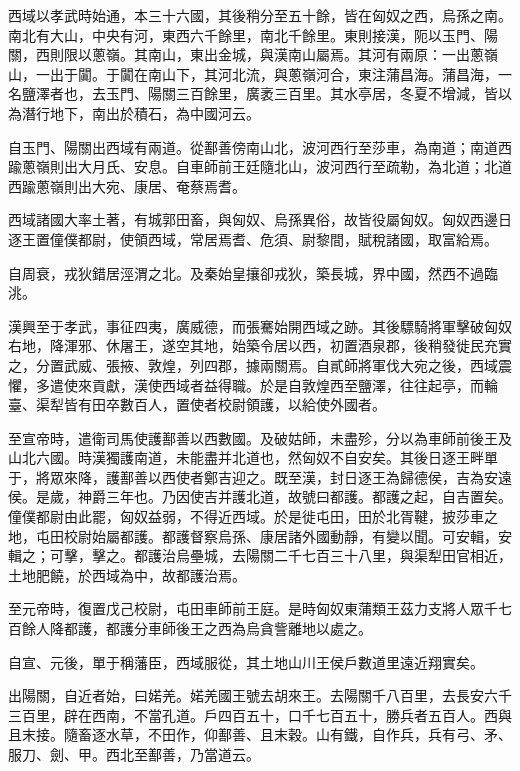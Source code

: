 
\begin{pinyinscope}
西域以孝武時始通，本三十六國，其後稍分至五十餘，皆在匈奴之西，烏孫之南。南北有大山，中央有河，東西六千餘里，南北千餘里。東則接漢，阨以玉門、陽關，西則限以蔥嶺。其南山，東出金城，與漢南山屬焉。其河有兩原：一出蔥嶺山，一出于闐。于闐在南山下，其河北流，與蔥嶺河合，東注蒲昌海。蒲昌海，一名鹽澤者也，去玉門、陽關三百餘里，廣袤三百里。其水亭居，冬夏不增減，皆以為潛行地下，南出於積石，為中國河云。

自玉門、陽關出西域有兩道。從鄯善傍南山北，波河西行至莎車，為南道；南道西踰蔥嶺則出大月氏、安息。自車師前王廷隨北山，波河西行至疏勒，為北道；北道西踰蔥嶺則出大宛、康居、奄蔡焉耆。

西域諸國大率土著，有城郭田畜，與匈奴、烏孫異俗，故皆役屬匈奴。匈奴西邊日逐王置僮僕都尉，使領西域，常居焉耆、危須、尉黎間，賦稅諸國，取富給焉。

自周衰，戎狄錯居涇渭之北。及秦始皇攘卻戎狄，築長城，界中國，然西不過臨洮。

漢興至于孝武，事征四夷，廣威德，而張騫始開西域之跡。其後驃騎將軍擊破匈奴右地，降渾邪、休屠王，遂空其地，始築令居以西，初置酒泉郡，後稍發徙民充實之，分置武威、張掖、敦煌，列四郡，據兩關焉。自貳師將軍伐大宛之後，西域震懼，多遣使來貢獻，漢使西域者益得職。於是自敦煌西至鹽澤，往往起亭，而輪臺、渠犁皆有田卒數百人，置使者校尉領護，以給使外國者。

至宣帝時，遣衛司馬使護鄯善以西數國。及破姑師，未盡殄，分以為車師前後王及山北六國。時漢獨護南道，未能盡并北道也，然匈奴不自安矣。其後日逐王畔單于，將眾來降，護鄯善以西使者鄭吉迎之。既至漢，封日逐王為歸德侯，吉為安遠侯。是歲，神爵三年也。乃因使吉并護北道，故號曰都護。都護之起，自吉置矣。僮僕都尉由此罷，匈奴益弱，不得近西域。於是徙屯田，田於北胥鞬，披莎車之地，屯田校尉始屬都護。都護督察烏孫、康居諸外國動靜，有變以聞。可安輯，安輯之；可擊，擊之。都護治烏壘城，去陽關二千七百三十八里，與渠犁田官相近，土地肥饒，於西域為中，故都護治焉。

至元帝時，復置戊己校尉，屯田車師前王庭。是時匈奴東蒲類王茲力支將人眾千七百餘人降都護，都護分車師後王之西為烏貪訾離地以處之。

自宣、元後，單于稱藩臣，西域服從，其土地山川王侯戶數道里遠近翔實矣。

出陽關，自近者始，曰婼羌。婼羌國王號去胡來王。去陽關千八百里，去長安六千三百里，辟在西南，不當孔道。戶四百五十，口千七百五十，勝兵者五百人。西與且末接。隨畜逐水草，不田作，仰鄯善、且末穀。山有鐵，自作兵，兵有弓、矛、服刀、劍、甲。西北至鄯善，乃當道云。


\end{pinyinscope}

